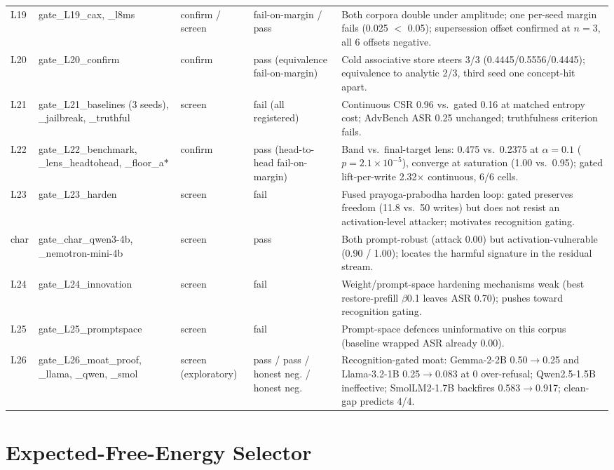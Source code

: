 \begin{table}[t]
{\begin{tabular}{lp{3.5cm}p{1.9cm}p{2.6cm}p{6.6cm}}
L19 & gate\_L19\_cax, \_l8ms & confirm / screen & fail-on-margin / pass & Both corpora double under amplitude; one per-seed margin fails (0.025 $<$ 0.05); supersession offset confirmed at $n=3$, all 6 offsets negative. \\
L20 & gate\_L20\_confirm & confirm & pass (equivalence fail-on-margin) & Cold associative store steers 3/3 (0.4445/0.5556/0.4445); equivalence to analytic 2/3, third seed one concept-hit apart. \\
L21 & gate\_L21\_baselines (3 seeds), \_jailbreak, \_truthful & screen & fail (all registered) & Continuous CSR 0.96 vs.\ gated 0.16 at matched entropy cost; AdvBench ASR 0.25 unchanged; truthfulness criterion fails. \\
L22 & gate\_L22\_benchmark, \_lens\_headtohead, \_floor\_a$\ast$ & confirm & pass (head-to-head fail-on-margin) & Band vs.\ final-target lens: 0.475 vs.\ 0.2375 at $\alpha=0.1$ ($p=2.1\times10^{-5}$), converge at saturation (1.00 vs.\ 0.95); gated lift-per-write 2.32$\times$ continuous, 6/6 cells. \\
L23 & gate\_L23\_harden & screen & fail & Fused prayoga-prabodha harden loop: gated preserves freedom (11.8 vs.\ 50 writes) but does not resist an activation-level attacker; motivates recognition gating. \\
char & gate\_char\_qwen3-4b, \_nemotron-mini-4b & screen & pass & Both prompt-robust (attack 0.00) but activation-vulnerable (0.90 / 1.00); locates the harmful signature in the residual stream. \\
L24 & gate\_L24\_innovation & screen & fail & Weight/prompt-space hardening mechanisms weak (best restore-prefill $\beta$0.1 leaves ASR 0.70); pushes toward recognition gating. \\
L25 & gate\_L25\_promptspace & screen & fail & Prompt-space defences uninformative on this corpus (baseline wrapped ASR already 0.00). \\
L26 & gate\_L26\_moat\_proof, \_llama, \_qwen, \_smol & screen (exploratory) & pass / pass / honest neg. / honest neg. & Recognition-gated moat: Gemma-2-2B 0.50$\to$0.25 and Llama-3.2-1B 0.25$\to$0.083 at 0 over-refusal; Qwen2.5-1.5B ineffective; SmolLM2-1.7B backfires 0.583$\to$0.917; clean-gap predicts 4/4. \\
\bottomrule
\end{tabular}}
\end{table}

\section{Expected-Free-Energy Selector}
\label{app:efe}

